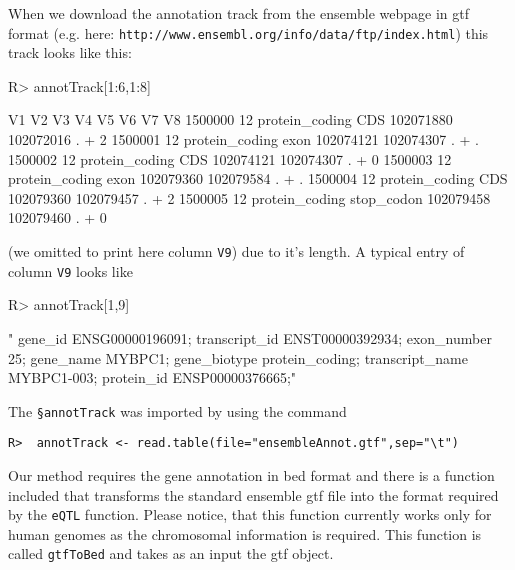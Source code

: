 \documentclass[a4paper,10pt]{article}
\begin{document}
When we download the annotation track from the ensemble webpage in gtf format (e.g. here: \texttt{http://www.ensembl.org/info/data/ftp/index.html}) this track looks like this:
\begin{Schunk}
\begin{Sinput}
R> annotTrack[1:6,1:8]
\end{Sinput}
\begin{Soutput}
        V1             V2         V3        V4        V5 V6 V7 V8
1500000 12 protein_coding        CDS 102071880 102072016  .  +  2
1500001 12 protein_coding       exon 102074121 102074307  .  +  .
1500002 12 protein_coding        CDS 102074121 102074307  .  +  0
1500003 12 protein_coding       exon 102079360 102079584  .  +  .
1500004 12 protein_coding        CDS 102079360 102079457  .  +  2
1500005 12 protein_coding stop_codon 102079458 102079460  .  +  0
\end{Soutput}
\end{Schunk}

(we omitted to print here column \texttt{V9}) due to it's length. A typical entry of column \texttt{V9} looks like 
\begin{Schunk}
\begin{Sinput}
R> annotTrack[1,9]
\end{Sinput}
\begin{Soutput}
[1] " gene_id ENSG00000196091; transcript_id ENST00000392934; exon_number 25; gene_name MYBPC1; gene_biotype protein_coding; transcript_name MYBPC1-003; protein_id ENSP00000376665;"
\end{Soutput}
\end{Schunk}

The \texttt{§annotTrack} was imported by using the command
\begin{verbatim}
R>  annotTrack <- read.table(file="ensembleAnnot.gtf",sep="\t")
\end{verbatim}

Our method requires the gene annotation in bed format and there is a function included that transforms the standard ensemble gtf file into 
the format required by the \texttt{eQTL} function. Please notice, that this function currently works only for human genomes as the chromosomal
information is required. This function is called \texttt{gtfToBed} and takes as an input the gtf object.
\end{document}
